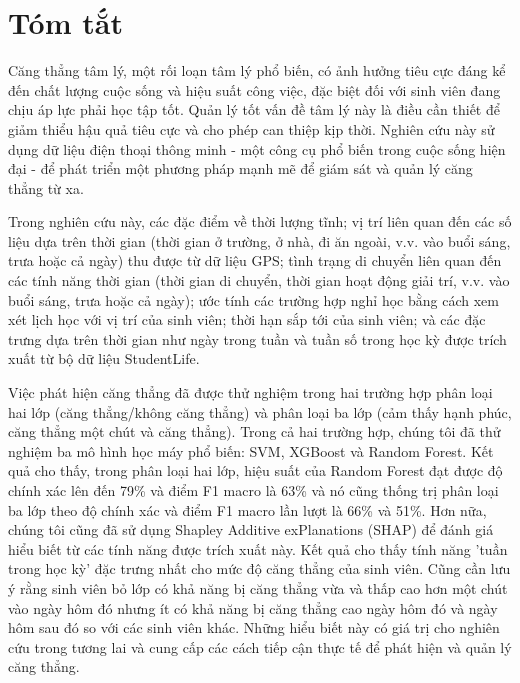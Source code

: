 \section*{Tóm tắt}
\thispagestyle{empty}
\fontsize{13}{16}
\selectfont
Căng thẳng tâm lý, một rối loạn tâm lý phổ biến, có ảnh hưởng tiêu cực đáng kể đến chất lượng cuộc sống và hiệu suất công việc, đặc biệt đối với sinh viên đang chịu áp lực phải học tập tốt. Quản lý tốt vấn đề tâm lý này là điều cần thiết để giảm thiểu hậu quả tiêu cực và cho phép can thiệp kịp thời. Nghiên cứu này sử dụng dữ liệu điện thoại thông minh - một công cụ phổ biến trong cuộc sống hiện đại - để phát triển một phương pháp mạnh mẽ để giám sát và quản lý căng thẳng từ xa.

Trong nghiên cứu này, các đặc điểm về thời lượng tĩnh; vị trí liên quan đến các số liệu dựa trên thời gian (thời gian ở trường, ở nhà, đi ăn ngoài, v.v. vào buổi sáng, trưa hoặc cả ngày) thu được từ dữ liệu GPS; tình trạng di chuyển liên quan đến các tính năng thời gian (thời gian di chuyển, thời gian hoạt động giải trí, v.v. vào buổi sáng, trưa hoặc cả ngày); ước tính các trường hợp nghỉ học bằng cách xem xét lịch học với vị trí của sinh viên; thời hạn sắp tới của sinh viên; và các đặc trưng dựa trên thời gian như ngày trong tuần và tuần số trong học kỳ được trích xuất từ bộ dữ liệu StudentLife.

Việc phát hiện căng thẳng đã được thử nghiệm trong hai trường hợp phân loại hai lớp (căng thẳng/không căng thẳng) và phân loại ba lớp (cảm thấy hạnh phúc, căng thẳng một chút và căng thẳng). Trong cả hai trường hợp, chúng tôi đã thử nghiệm ba mô hình học máy phổ biến: SVM, XGBoost và Random Forest. Kết quả cho thấy, trong phân loại hai lớp, hiệu suất của Random Forest đạt được độ chính xác lên đến 79\% và điểm F1 macro là 63\% và nó cũng thống trị phân loại ba lớp theo độ chính xác và điểm F1 macro lần lượt là 66\% và 51\%. Hơn nữa, chúng tôi cũng đã sử dụng Shapley Additive exPlanations (SHAP) để đánh giá hiểu biết từ các tính năng được trích xuất này. Kết quả cho thấy tính năng 'tuần trong học kỳ' đặc trưng nhất cho mức độ căng thẳng của sinh viên. Cũng cần lưu ý rằng sinh viên bỏ lớp có khả năng bị căng thẳng vừa và thấp cao hơn một chút vào ngày hôm đó nhưng ít có khả năng bị căng thẳng cao ngày hôm đó và  ngày hôm sau đó so với các sinh viên khác. Những hiểu biết này có giá trị cho nghiên cứu trong tương lai và cung cấp các cách tiếp cận thực tế để phát hiện và quản lý căng thẳng.

\clearpage
{}
